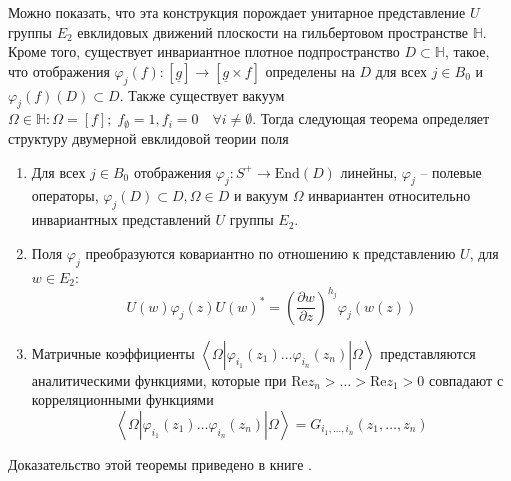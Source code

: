 Можно показать, что эта конструкция порождает унитарное представление $U$ группы $E_{2}$ евклидовых движений плоскости на гильбертовом пространстве $\mathbb{H}$. Кроме того, существует инвариантное плотное подпространство $D\subset \mathbb{H}$, такое, что отображения $\varphi_{j}(f):[\underline{g}]\to [\underline{g}\times f]$ определены на $D$ для всех $j\in B_{0}$ и $\varphi_{j}(f)(D)\subset D$. Также существует вакуум $\Omega\in\mathbb{H}: \Omega=[f];\; f_{\emptyset}=1, f_{i}=0\quad \forall i\neq \emptyset$. Тогда
следующая теорема определяет структуру двумерной евклидовой теории поля
\begin{theorem}
  \begin{enumerate}
  \item Для всех $j\in B_{0}$ отображения $\varphi_{j}:S^{+}\to \mathrm{End}(D)$ линейны, $\varphi_{j}$ -- полевые операторы, $\varphi_{j}(D)\subset D, \Omega\in D$ и вакуум $\Omega$ инвариантен относительно инвариантных представлений $U$ группы $E_{2}$.
  \item Поля $\varphi_{j}$ преобразуются ковариантно по отношению к представлению $U$, для $w\in E_{2}$:
    \begin{equation}
      \label{eq:57}
      U(w)\varphi_{j}(z)U(w)^{*}=\left(\frac{\partial w}{\partial z}\right)^{h_{j}}\varphi_{j}(w(z))
    \end{equation}
  \item Матричные коэффициенты $\left<\Omega|\varphi_{i_{1}}(z_{1})\dots \varphi_{i_{n}}(z_{n})|\Omega\right>$ представляются аналитическими функциями, которые при $\mathrm{Re}z_{n}>\dots>\mathrm{Re}z_{1}>0$ совпадают с корреляционными функциями
  \begin{equation}
    \label{eq:56}
    \left<\Omega|\varphi_{i_{1}}(z_{1})\dots \varphi_{i_{n}}(z_{n})|\Omega\right>=G_{i_{1},\dots,i_{n}}(z_{1},\dots,z_{n})
  \end{equation}
  \end{enumerate}
\end{theorem}
Доказательство этой теоремы приведено в книге \cite{schottenloher2008mathematical}.

